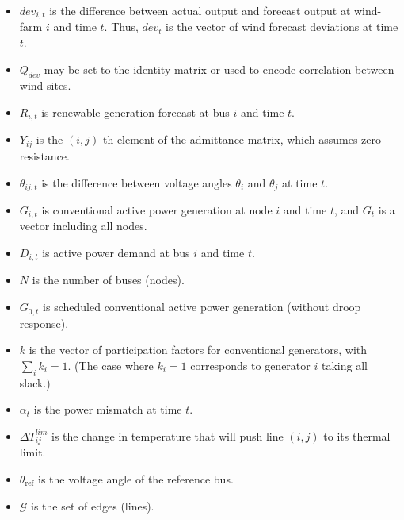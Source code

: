 \documentclass[conference]{IEEEtran}
\begin{document}
\begin{itemize}
\itemsep1pt\parskip0pt
\item $dev_{i,t}$ is the difference between actual output and forecast output at wind-farm $i$ and time $t$. Thus, $dev_t$ is the vector of wind forecast deviations at time $t$.
\item $Q_{dev}$ may be set to the identity matrix or used to encode correlation between wind sites.
\item $R_{i,t}$ is renewable generation forecast at bus $i$ and time $t$.
\item $Y_{ij}$ is the $(i,j)$-th element of the admittance matrix, which assumes zero resistance.
\item $\theta_{ij,t}$ is the difference between voltage angles $\theta_i$ and $\theta_j$ at time $t$.
\item $G_{i,t}$ is conventional active power generation at node $i$ and time $t$, and $G_t$ is a vector including all nodes.
\item $D_{i,t}$ is active power demand at bus $i$ and time $t$.
\item $N$ is the number of buses (nodes).
\item $G_{0,t}$ is scheduled conventional active power generation (without droop response).
\item $k$ is the vector of participation factors for conventional generators, with $\sum_i k_i = 1$. (The case where $k_i=1$ corresponds to generator $i$ taking all slack.)
\item $\alpha_t$ is the power mismatch at time $t$.
%
\item $\Delta T_{ij}^{lim}$ is the change in temperature that will push line $(i,j)$ to its thermal limit.
\item $\theta_\text{ref}$ is the voltage angle of the reference bus.
\item $\mathcal{G}$ is the set of edges (lines).
\end{itemize}
\end{document}
